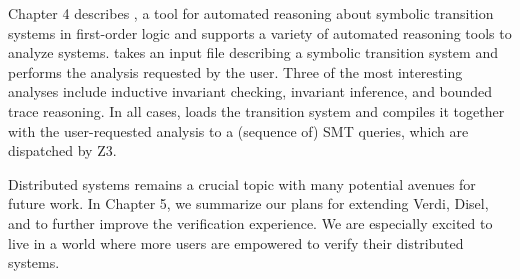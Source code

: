 Chapter 4 describes \mypyvy, a tool for automated reasoning about
symbolic transition systems in first-order logic and supports a
variety of automated reasoning tools to analyze systems.
\mypyvy takes an input file describing a symbolic transition system
and performs the analysis requested by the user. Three of the most
interesting analyses include inductive invariant checking,
invariant inference, and bounded trace reasoning.
In all cases, \mypyvy loads the transition system and compiles
it together with the user-requested analysis to a (sequence of) SMT queries,
which are dispatched by Z3.

Distributed systems remains a crucial topic with many potential avenues
for future work. In Chapter 5, we summarize our plans for extending
Verdi, Disel, and \mypyvy to further improve the verification experience.
We are especially excited to live in a world where more users are
empowered to verify their distributed systems.